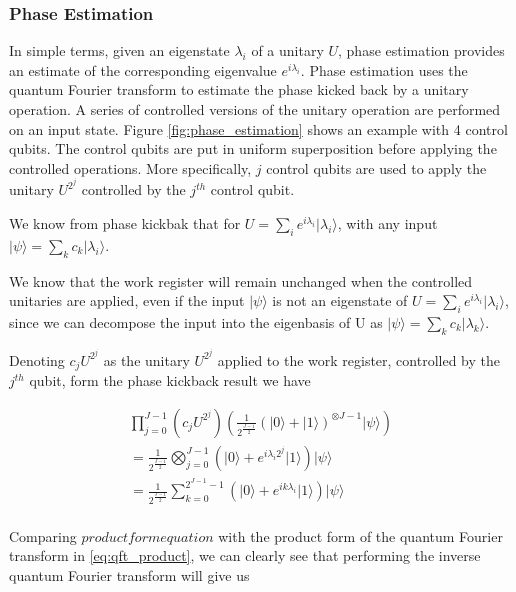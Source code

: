 \documentclass{article}
\begin{document}
\subsubsection{Phase Estimation}

In simple terms, given an eigenstate $\lambda_{i}$ of a unitary $U$, phase estimation provides an estimate of the corresponding eigenvalue $e^{i\lambda_i}$. Phase estimation uses the quantum Fourier transform to estimate the phase kicked back by a unitary operation. A series of controlled versions of the unitary operation are performed on an input state. Figure \ref{fig:phase_estimation} shows an example with 4 control qubits. The control qubits are put in uniform superposition before applying the controlled operations.  More specifically, $j$ control qubits are used to apply the unitary $U^{2^{j}}$ controlled by the $j^{th}$ control qubit.

We know from phase kickbak that for $U = \sum_i e^{i \lambda_i} \lvert \lambda _i \rangle $, with any input $\lvert \psi \rangle = \sum_{k} c_k \lvert \lambda_i \rangle$.

We know that the work register will remain unchanged when the controlled unitaries are applied, even if the input $\lvert \psi \rangle$ is not an eigenstate of  $U = \sum_i e^{i \lambda_i} \lvert \lambda _i \rangle $, since we can decompose the input into the eigenbasis of U as  $\lvert \psi \rangle = \sum_{k} c_k \lvert \lambda_k \rangle$.

Denoting $c_j U^{2^{j}}$ as the unitary $U^{2^{j}}$ applied to the work register, controlled by the $j^{th}$ qubit, form the phase kickback result we have

\begin{multline}
\prod_{j=0}^{J-1} (c_j U^{2^{j}}) ( \frac{1}{2^{\frac{J-1}{2}}}( \lvert 0 \rangle + \lvert 1 \rangle )^{\otimes J-1} \lvert \psi \rangle)
\\
 =  \frac{1}{2^{\frac{J-1}{2}}} \bigotimes_{j=0}^{J-1} ( \lvert 0 \rangle + e^{i \lambda_i 2^{j}} \lvert 1 \rangle ) \lvert \psi \rangle
\\
 =  \frac{1}{2^{\frac{J-1}{2}}} \sum_{k=0}^{2^{J-1}-1}  ( \lvert 0 \rangle + e^{i k \lambda_i } \lvert 1 \rangle ) \lvert \psi \rangle
\\
\end{multline}

Comparing $product form equation$ with the product form of the quantum Fourier transform in \ref{eq:qft_product}, we can clearly see that performing the inverse quantum Fourier transform will give us
\end{document}
